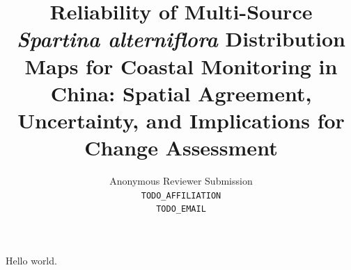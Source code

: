 \documentclass[11pt]{article}
\title{Reliability of Multi-Source \textit{Spartina alterniflora} Distribution Maps
for Coastal Monitoring in China: Spatial Agreement, Uncertainty, and Implications
for Change Assessment}
\author{Anonymous Reviewer Submission \\
\texttt{TODO_AFFILIATION \\ TODO_EMAIL}}
\date{}
\begin{document}
\maketitle

Hello world.
\end{document}
